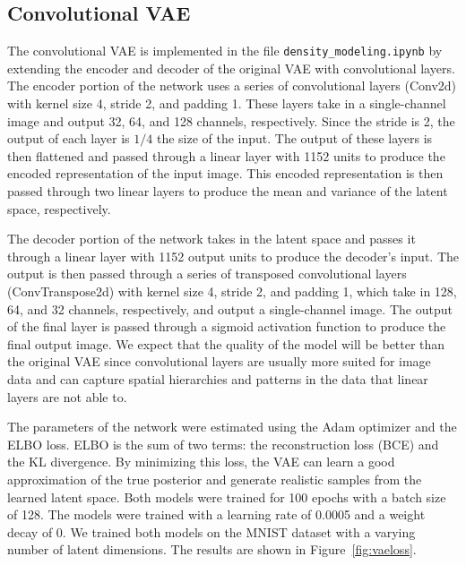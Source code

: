 \subsection*{Convolutional VAE}
The convolutional VAE is implemented in the file \texttt{density\_modeling.ipynb} by extending the encoder and decoder of the original VAE with convolutional layers. The encoder portion of the network uses a series of convolutional layers (Conv2d) with kernel size 4, stride 2, and padding 1. These layers take in a single-channel image and output 32, 64, and 128 channels, respectively. Since the stride is 2, the output of each layer is $1/4$ the size of the input. The output of these layers is then flattened and passed through a linear layer with 1152 units to produce the encoded representation of the input image. This encoded representation is then passed through two linear layers to produce the mean and variance of the latent space, respectively.

The decoder portion of the network takes in the latent space and passes it through a linear layer with 1152 output units to produce the decoder's input. The output is then passed through a series of transposed convolutional layers (ConvTranspose2d) with kernel size 4, stride 2, and padding 1, which take in 128, 64, and 32 channels, respectively, and output a single-channel image. The output of the final layer is passed through a sigmoid activation function to produce the final output image. We expect that the quality of the model will be better than the original VAE since convolutional layers are usually more suited for image data and can capture spatial hierarchies and patterns in the data that linear layers are not able to.

The parameters of the network were estimated using the Adam optimizer and the ELBO loss. ELBO is the sum of two terms: the reconstruction loss (BCE) and the KL divergence. By minimizing this loss, the VAE can learn a good approximation of the true posterior and generate realistic samples from the learned latent space. Both models were trained for 100 epochs with a batch size of 128. The models were trained with a learning rate of 0.0005 and a weight decay of 0. We trained both models on the MNIST dataset with a varying number of latent dimensions. The results are shown in Figure~\ref{fig:vaeloss}.

